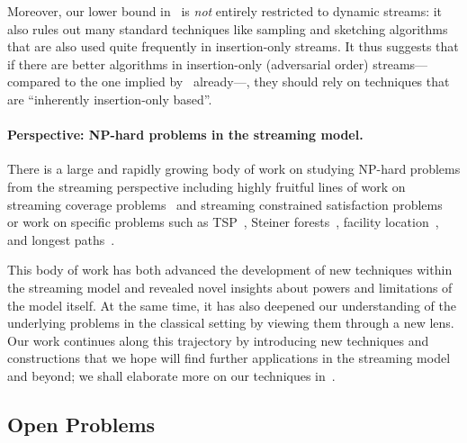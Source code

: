 \documentclass[11pt]{article}
\theoremstyle{definition}
\begin{document}
Moreover, our lower bound in~ is \emph{not} entirely restricted to dynamic streams: it also rules out many standard techniques like sampling and sketching algorithms that are also used quite frequently in insertion-only streams. It thus suggests 
that if there are better algorithms in insertion-only (adversarial order) streams---compared to the one implied by~ already---, they should rely on techniques that are ``inherently insertion-only based''. 

\paragraph{Perspective: NP-hard problems in the streaming model.} There is a large and rapidly growing body of work on studying NP-hard problems from the streaming perspective including highly fruitful lines of work on streaming coverage problems~\cite{DemaineIMV14,Har-PeledIMV16,AssadiKL16,Assadi17,AssadiK18,IndykV19,McGregorV19,ChakrabartiMW24} and streaming constrained satisfaction problems~\cite{GuruswamiVV17,ChouGV20,ChouGSV21,SingerSV21,ChouGSVV22,SaxenaSSV23,ChouGSV24} or work 
on specific problems such as TSP~\cite{ChenKT23,AlipourFM25}, Steiner forests~\cite{CzumajJKV22}, facility location~\cite{CzumajJKVY22}, and longest paths~\cite{KonradT25}. 

This body of work has both advanced the development of new techniques within the streaming model and revealed novel insights about powers and limitations of the model itself. At the same time, it has also 
deepened our understanding of the underlying problems in the classical setting by viewing them through a new lens. Our work continues along this trajectory by introducing new techniques and constructions that we 
hope will find further applications in the streaming model and beyond; we shall elaborate more on our techniques in~. 

\subsection{Open Problems}\label{sec:open} 
\end{document}
